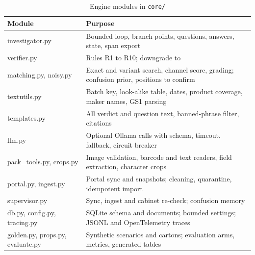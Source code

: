 \begin{table}[htbp]
\centering
\caption{Engine modules in \texttt{core/}}
\label{tab:modules}
\footnotesize
\begin{tabularx}{\linewidth}{@{}>{\ttfamily}l >{\raggedright\arraybackslash}X@{}}
\toprule
\normalfont\textbf{Module} & \textbf{Purpose} \\ \midrule
investigator.py & Bounded loop, branch points, questions, answers, state, span export \\
verifier.py & Rules R1 to R10; downgrade to \CANTV{} \\
matching.py, noisy.py & Exact and variant search, channel score, grading; confusion prior, positions to confirm \\
textutils.py & Batch key, look-alike table, dates, product coverage, maker names, GS1 parsing \\
templates.py & All verdict and question text, banned-phrase filter, citations \\
llm.py & Optional Ollama calls with schema, timeout, fallback, circuit breaker \\
pack\_tools.py, crops.py & Image validation, barcode and text readers, field extraction, character crops \\
portal.py, ingest.py & Portal sync and snapshots; cleaning, quarantine, idempotent import \\
supervisor.py & Sync, ingest and cabinet re-check; confusion memory \\
db.py, config.py, tracing.py & SQLite schema and documents; bounded settings; JSONL and OpenTelemetry traces \\
golden.py, props.py, evaluate.py & Synthetic scenarios and cartons; evaluation arms, metrics, generated tables \\
\bottomrule
\end{tabularx}
\end{table}
